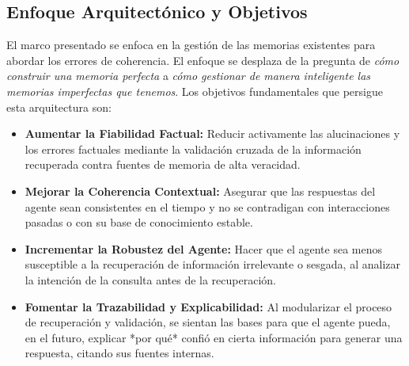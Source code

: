 \documentclass[journal,onecolumn]{IEEEtran}
\begin{document}
\subsection{Enfoque Arquitectónico y Objetivos}
El marco presentado se enfoca en la gestión de las memorias existentes para abordar los errores de coherencia. El enfoque se desplaza de la pregunta de \textit{cómo construir una memoria perfecta} a \textit{cómo gestionar de manera inteligente las memorias imperfectas que tenemos}. Los objetivos fundamentales que persigue esta arquitectura son:
\begin{itemize}
    \item \textbf{Aumentar la Fiabilidad Factual:} Reducir activamente las alucinaciones y los errores factuales mediante la validación cruzada de la información recuperada contra fuentes de memoria de alta veracidad.
    \item \textbf{Mejorar la Coherencia Contextual:} Asegurar que las respuestas del agente sean consistentes en el tiempo y no se contradigan con interacciones pasadas o con su base de conocimiento estable.
    \item \textbf{Incrementar la Robustez del Agente:} Hacer que el agente sea menos susceptible a la recuperación de información irrelevante o sesgada, al analizar la intención de la consulta antes de la recuperación.
    \item \textbf{Fomentar la Trazabilidad y Explicabilidad:} Al modularizar el proceso de recuperación y validación, se sientan las bases para que el agente pueda, en el futuro, explicar *por qué* confió en cierta información para generar una respuesta, citando sus fuentes internas.
\end{itemize}
\end{document}
